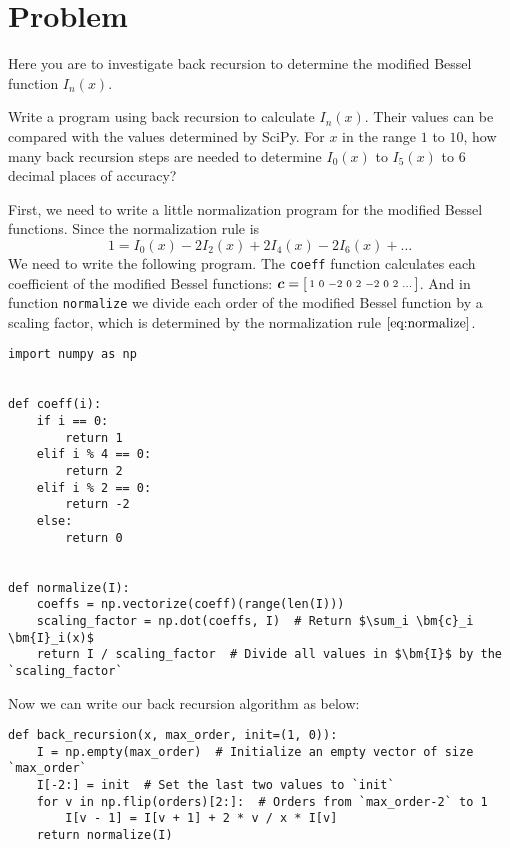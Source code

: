\section{Problem \thesection}

Here you are to investigate back recursion to determine the modified Bessel function
$I_n(x)$.

\Question Write a program using back recursion to calculate $I_n(x)$.
Their values can be compared with the values determined by SciPy.
For $x$ in the range $1$ to $10$, how many back recursion steps are needed to
determine $I_0(x)$ to $I_5(x)$ to $6$ decimal places of accuracy?

\Answer First, we need to write a little normalization program for the modified Bessel functions.
Since the normalization rule is
%
\begin{equation}\label{eq:normalize}
    1 = I_0(x) - 2 I_2(x) + 2 I_4(x) - 2 I_6(x) + \ldots
\end{equation}
%
We need to write the following program.
The \texttt{coeff} function calculates each coefficient of the
modified Bessel functions: $\bm{c} = \begin{bsmallmatrix}1 & 0 & -2 & 0 & 2 & -2 & 0 & 2 & \ldots\end{bsmallmatrix}$.
And in function \texttt{normalize} we divide each order of the modified Bessel function
by a scaling factor, which is determined by the normalization rule $\eqref{eq:normalize}$.

\begin{verbatim}
import numpy as np


def coeff(i):
    if i == 0:
        return 1
    elif i % 4 == 0:
        return 2
    elif i % 2 == 0:
        return -2
    else:
        return 0


def normalize(I):
    coeffs = np.vectorize(coeff)(range(len(I)))
    scaling_factor = np.dot(coeffs, I)  # Return $\sum_i \bm{c}_i \bm{I}_i(x)$
    return I / scaling_factor  # Divide all values in $\bm{I}$ by the `scaling_factor`
\end{verbatim}

Now we can write our back recursion algorithm as below:

\begin{verbatim}
def back_recursion(x, max_order, init=(1, 0)):
    I = np.empty(max_order)  # Initialize an empty vector of size `max_order`
    I[-2:] = init  # Set the last two values to `init`
    for v in np.flip(orders)[2:]:  # Orders from `max_order-2` to 1
        I[v - 1] = I[v + 1] + 2 * v / x * I[v]
    return normalize(I)
\end{verbatim}

